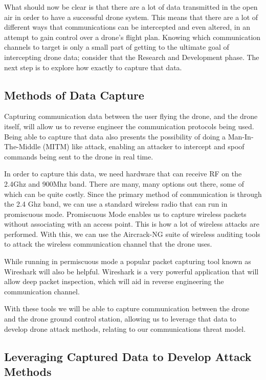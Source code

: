 \documentclass[IEEEtran,letterpaper,10pt,titlepage,draftclsnofoot,onecolumn]{article}
\begin{document}
What should now be clear is that there are a lot of data transmitted in the open air in order to have a successful
drone system. This means that there are a lot of different ways that communications can be intercepted and even
altered, in an attempt to gain control over a drone's flight plan. Knowing which communication channels to target
is only a small part of getting to the ultimate goal of intercepting drone data; consider that the Research and
Development phase. The next step is to explore how exactly to capture that data.

\subsection*{Methods of Data Capture}
Capturing communication data between the user flying the drone, and the drone itself, will allow us to reverse engineer
the communication protocols being used. Being able to capture that data also presents the possibility of doing a
Man-In-The-Middle (MITM) like attack, enabling an attacker to intercept and spoof commands being sent to the drone
in real time.

In order to capture this data, we need hardware that can receive RF on the 2.4Ghz and 900Mhz band. There are many, many
options out there, some of which can be quite costly. Since the primary method of communication is through the 2.4 Ghz
band, we can use a standard wireless radio that can run in promiscuous mode\cite{WiFiPerc}. Promiscuous Mode enables
us to capture wireless packets without associating with an access point. This is how a lot of wireless attacks are
performed\cite{WiFiPerc}. With this, we can use the Aircrack-NG suite of wireless auditing tools to attack the wireless
communication channel that the drone uses\cite{AircrackNG}.

While running in permiscuous mode a popular packet capturing tool known as Wireshark will also be helpful. Wireshark
is a very powerful application that will allow deep packet inspection, which will aid in reverse engineering the
communication channel\cite{WiFiPerc}.

With these tools we will be able to capture communication between the drone and the drone ground control station, allowing
us to leverage that data to develop drone attack methods, relating to our communications threat model.

\subsection*{Leveraging Captured Data to Develop Attack Methods}
\end{document}
